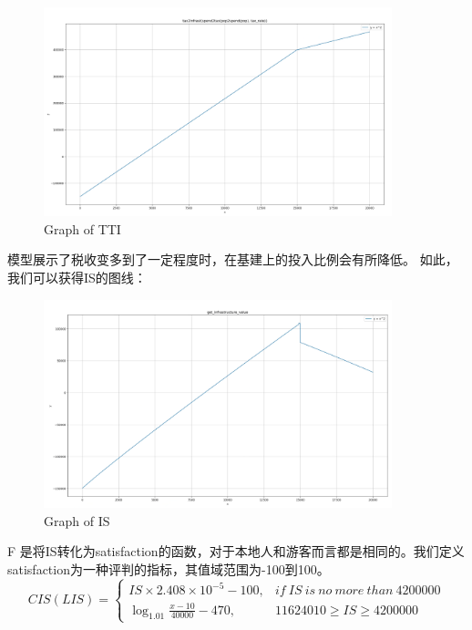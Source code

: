 \documentclass[12pt]{article}  %
\begin{document}
\begin{enumerate}[(1)]
\begin{figure}[htbp]
    \centering  %
    \includegraphics[width=0.9\textwidth]{tax2inf.png} %
    \caption{Graph of TTI} %
    \label{fig1}%
    \end{figure}
模型展示了税收变多到了一定程度时，在基建上的投入比例会有所降低。
如此，我们可以获得IS的图线：
\begin{figure}[h]  %
 
    \centering  %
    \includegraphics[width=0.9\textwidth]{IS.png} %
    \caption{Graph of IS} %
    \label{fig1}%
    \end{figure}
\clearpage
F 是将IS转化为satisfaction的函数，对于本地人和游客而言都是相同的。我们定义satisfaction为一种评判的指标，其值域范围为-100到100。
$$
CIS(LIS)=
\begin{cases}
    IS\times 2.408\times 10^{-5}-100, &if\ IS\ is\ no\ more\ than\ 4200000\\
    \log_{1.01}{\frac{x-10}{40000}}-470, &11624010\geq IS \geq 4200000
\end{cases}
$$
\end{enumerate}
\end{document}

